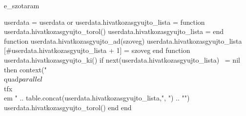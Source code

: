 \startenvironment e_szotaram

\startluacode
  userdata = userdata or {}
  userdata.hivatkozasgyujto_lista = {}
  function userdata.hivatkozasgyujto_torol()
    userdata.hivatkozasgyujto_lista = {}
  end
  function userdata.hivatkozasgyujto_ad(szoveg)
    userdata.hivatkozasgyujto_lista [#userdata.hivatkozasgyujto_lista + 1] = szoveg
  end
  function userdata.hivatkozasgyujto_ki()
    if next(userdata.hivatkozasgyujto_lista) ~= nil then
      context("\\quad$\\parallel$~{\\tfx\\em " .. table.concat(userdata.hivatkozasgyujto_lista,", ") .. "}")
      userdata.hivatkozasgyujto_torol()
    end
  end
\stopluacode





\def\Szotextcommand#1{\hbox{#1\enspace\bullet\enspace}}


\setupfloats[szo][sidealign=line]


\setuphead[Szo][%
  number=no,%
  textdistance=0pt,%
  insidesection={\resetcounter[SzoBekSzam]},%
  style=\bf,%
]


